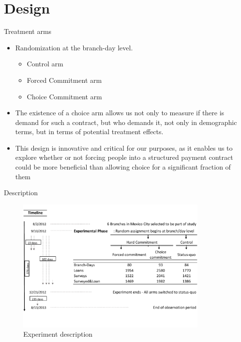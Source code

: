 \documentclass[8pt]{beamer}
\begin{document}
\section{Design}



\begin{frame}{Treatment arms}
   \begin{itemize}
    \vfill \item Randomization at the branch-day level. 
    \begin{itemize}
        \vfill \item Control arm 
       \vfill \item Forced Commitment arm
       \vfill \item Choice Commitment arm
    \end{itemize}
    \vfill \item The  existence  of  a  choice  arm  allows  us  not  only  to  measure  if  there  is  demand  for  such  a contract, but who demands it, not only in demographic terms, but in terms of potential treatment effects.
   \vfill \item  This design is innovative and critical for our purposes, as it enables us to explore whether or not forcing people into a structured payment contract could be more beneficial than allowing choice for a significant fraction of them
\end{itemize}
\end{frame}


\begin{frame}{Description}

\begin{figure}[H]
     \caption{Experiment description}
    \label{exp_description}
\begin{center}
        \includegraphics[width=0.85\textwidth]{Figuras/consort.pdf}
  \end{center}
\end{figure}

\end{frame}
\end{document}

